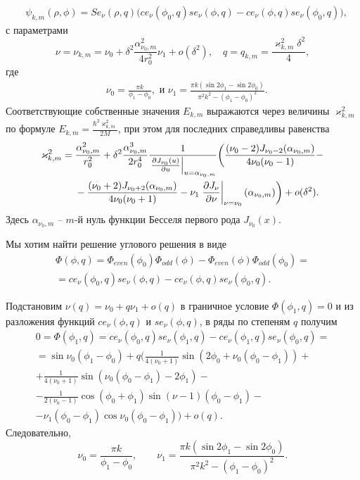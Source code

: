 \begin{align}
&\psi_{k, m}(\rho, \phi) = 
    Se_\nu(\rho, q) \biggl( ce_\nu(\phi_0, q) se_\nu(\phi, q) -ce_\nu(\phi, q) se_\nu(\phi_0, q) \biggr) ,  \label{eq:funB}
\end{align}
с параметрами
\begin{equation*}    
\nu = \nu_{k,m} = \nu_0 +\delta^2 \frac{\alpha_{\nu_0, m}^2}{4 r_0^2} \nu_1 + o(\delta^2), \quad q=q_{k,m} = \frac{\varkappa_{k,m}^2 \delta^2}{4},
\end{equation*}
где
\begin{align*}
& \nu_0 = \frac{\pi k}{\phi_1-\phi_0},\text{\ \ и \ \ }
\nu_1= \frac{\pi k (\sin 2\phi_1 - \sin 2 \phi_0)}{\pi^2k^2-(\phi_1-\phi_0)^2} .
\end{align*}
Соответствующие собственные значения $E_{k, m}$ выражаются через величины $\varkappa^2_{k, m}$ по формуле $E_{k, m} =  \frac{\hbar^2 \varkappa^2_{k, m}}{2M}$, при этом для последних  справедливы равенства
\begin{align}
\varkappa_{k, m}^2 ={}& \frac{\alpha_{\nu_0, m}^2}{r_0^2} +  \delta^2 \frac{\alpha_{\nu_0, m}^3}{2 r_0^4}\frac{1}{ \left.\frac{\partial J_{\nu_0}(u)}{\partial u}\right|_{u=\alpha_{\nu_0, m}} }  
 \biggl(\frac{(\nu_0 - 2)J_{\nu_0-2}(\alpha_{\nu_0, m})   }{4\nu_0 (\nu_0-1)} -
\notag \\ 
&{}- \frac{(\nu_0 + 2)J_{\nu_0+2}(\alpha_{\nu_0, m})}{4\nu_0 (\nu_0+1)} 
- \nu_1 \left.\frac{\partial J_\nu}{\partial \nu}\right|_{\nu = \nu_0}(\alpha_{\nu_0, m})
    \biggr) + o(\delta^2).\label{eq:valB}
\end{align}
Здесь $\alpha_{\nu_0,m}$ -- $m$-й нуль функции Бесселя первого рода $J_{\nu_0}(x)$.


Мы хотим найти решение углового решения в виде
\begin{multline*}
\Phi(\phi, q) = \Phi_{even}(\phi_0) \Phi_{odd}(\phi) - \Phi_{even}(\phi) \Phi_{odd}(\phi_0)  = \\
=ce_\nu(\phi_0, q) se_\nu(\phi, q) - ce_\nu(\phi, q) se_\nu(\phi_0, q).
\end{multline*}

 
Подстановим $\nu(q) = \nu_0 + q \nu_1 + o(q)$
в граничное условие  $\Phi(\phi_1, q) = 0$
и из разложения функций $ce_\nu(\phi, q)$ и $se_\nu(\phi, q)$, в ряды по степеням  $q$
 получим
\begin{multline*}
0=\Phi(\phi_1, q) = ce_\nu(\phi_0, q) se_\nu(\phi_1, q) -ce_\nu(\phi_1, q) se_\nu(\phi_0, q) = \\
= \sin \nu_0 (\phi_1 - \phi_0) +q \biggl(
\frac{1}{4(\nu_0+1)}  \sin{(2 \phi_0 + \nu_0(\phi_0-\phi_1))}+  \\
+\frac{1}{4(\nu_0+1)} \sin{(\nu_0(\phi_0-\phi_1)-2\phi_1)} - \\
-\frac{1}{2(\nu_0-1)}\cos{(\phi_0 + \phi_1)}\sin{(\nu-1)(\phi_0-\phi_1)} -\\
- \nu_1 (\phi_0 - \phi_1) \cos{\nu_0(\phi_0-\phi_1)} \biggr) + o(q).
\end{multline*}
Следовательно, 
\begin{equation*}
    \nu_0 = \frac{\pi k}{\phi_1-\phi_0}, \qquad \nu_1 = \frac{\pi k (\sin 2\phi_1 - \sin 2 \phi_0)}{\pi^2k^2-(\phi_1-\phi_0)^2}.
\end{equation*}

